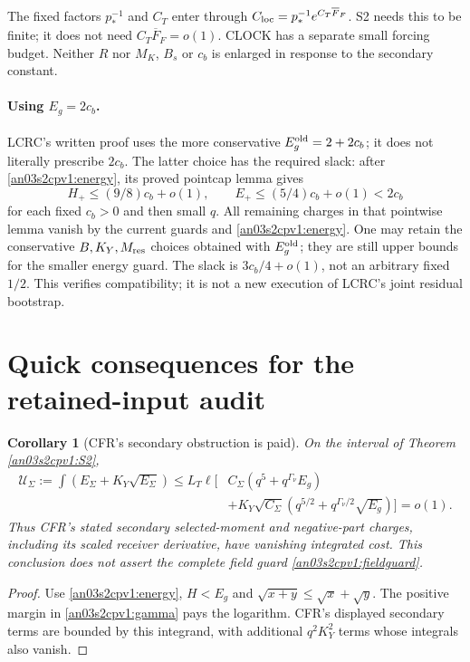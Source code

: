 \documentclass[11pt]{article}
\newtheorem{corollary}[theorem]{Corollary}
\theoremstyle{remark}\newtheorem{remark}[theorem]{Remark}
\begin{document}
The fixed factors $p_*^{-1}$ and $C_T$ enter through
$C_{\rm loc}=p_*^{-1}e^{C_T\overline F_F}$. S2 needs this to be
finite; it does not need $C_T\overline F_F=o(1)$. CLOCK has a
separate small forcing budget. Neither $R$ nor $M_K$, $B_s$ or
$c_b$ is enlarged in response to the secondary constant.

\paragraph{Using $E_g=2c_b$.}
LCRC's written proof uses the more conservative
$E_g^{\rm old}=2+2c_b$; it does not literally prescribe $2c_b$.
The latter choice has the required slack: after
\eqref{an03s2cpv1:energy}, its proved pointcap lemma gives
\begin{equation}
 H_+\le(9/8)c_b+o(1),\qquad E_+\le(5/4)c_b+o(1)<2c_b
 \label{an03s2cpv1:smallEg}
\end{equation}
for each fixed $c_b>0$ and then small $q$. All remaining charges
in that pointwise lemma vanish by the current guards and
\eqref{an03s2cpv1:energy}. One may retain the conservative
$B,K_Y,M_{\rm res}$ choices obtained with $E_g^{\rm old}$;
they are still upper bounds for the smaller energy guard.
The slack is $3c_b/4+o(1)$, not an arbitrary fixed $1/2$.
This verifies compatibility; it is not a new execution of
LCRC's joint residual bootstrap.

\section{Quick consequences for the retained-input audit}
\begin{corollary}[CFR's secondary obstruction is paid]
\label{an03s2cpv1:U}
On the interval of Theorem \ref{an03s2cpv1:S2},
\begin{align}
 \mathcal U_\Sigma
 :=\int(E_\Sigma+K_Y\sqrt{E_\Sigma})
 \le L_T\ell\big[&C_\Sigma(q^5+q^{\Gamma_\nu}E_g)\nonumber\\
 &+K_Y\sqrt{C_\Sigma}
       (q^{5/2}+q^{\Gamma_\nu/2}\sqrt{E_g})\big]=o(1).
 \label{an03s2cpv1:Ubound}
\end{align}
Thus CFR's stated secondary selected-moment and negative-part
charges, including its scaled receiver derivative, have
vanishing integrated cost. This conclusion does not assert
the complete field guard \eqref{an03s2cpv1:fieldguard}.
\end{corollary}
\begin{proof}
Use \eqref{an03s2cpv1:energy}, $H<E_g$ and
$\sqrt{x+y}\le\sqrt x+\sqrt y$. The positive margin in
\eqref{an03s2cpv1:gamma} pays the logarithm. CFR's displayed
secondary terms are bounded by this integrand, with additional
$q^2K_Y^2$ terms whose integrals also vanish.
\end{proof}
\end{document}
